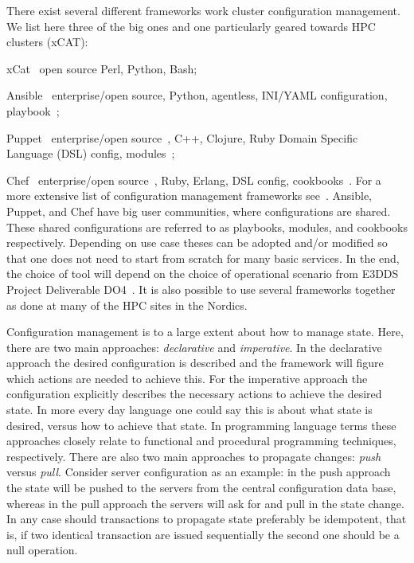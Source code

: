 \documentclass[12pt,a4paper]{article}
\begin{document}
There exist several different frameworks work cluster configuration management. We list here three of the big ones and one particularly geared towards HPC clusters (xCAT):
\bitm
\item xCat~\cite{xcat} open source  Perl, Python, Bash;
\item Ansible~\cite{ansible} enterprise/open source, Python, agentless, INI/YAML configuration, playbook~\cite{ansible-galaxy};
\item Puppet~\cite{puppet} enterprise/open source~\cite{puppet-osp},  C++, Clojure, Ruby Domain Specific Language (DSL) config, modules~\cite{puppet-forge};
\item Chef~\cite{chef} enterprise/open source~\cite{chef-infra}, Ruby, Erlang, DSL config, cookbooks~\cite{chef-cookbooks}.
\eitm
For a more extensive list of configuration management frameworks see~\cite{open-source-config}.
Ansible, Puppet, and Chef have big user communities, where configurations are shared. These shared configurations are referred to as playbooks, modules, and cookbooks respectively. Depending on use case theses can be adopted and/or modified so that one does not need to start from scratch for many basic services. 
In the end, the choice of tool will depend on the choice of operational scenario from E3DDS Project Deliverable DO4~\cite{e3dds-del-4}. It is also possible to use several frameworks together as done at many of the HPC sites in the Nordics. 

Configuration management is to a large extent about how to manage state. Here, there are two main approaches: \emph{declarative} and \emph{imperative}. In the declarative approach the desired configuration is described and the framework will figure which actions are needed to achieve this. For the imperative approach the configuration explicitly describes the necessary actions to achieve the desired state. In more every day language one could say this is about what state is desired, versus how to achieve that state. 
In programming language terms these approaches closely relate to functional and procedural programming techniques, respectively. 
There are also two main approaches to propagate changes: \emph{push} versus \emph{pull}. 
Consider server configuration as an example: in the push approach the state will be pushed to the servers from the central configuration data base, whereas in the pull approach the servers will ask for and pull in the state change.
In any case should transactions to propagate state preferably be idempotent, that is, if two identical transaction are issued sequentially the second one should be a null operation.  
\end{document}
